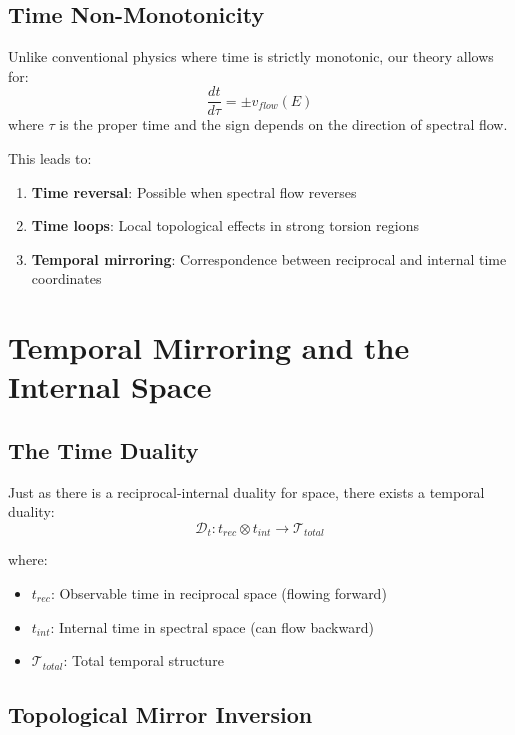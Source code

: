\subsection{Time Non-Monotonicity}

Unlike conventional physics where time is strictly monotonic, our theory allows for:
\begin{equation}
    \frac{dt}{d\tau} = \pm v_{flow}(E)
\end{equation}
where $\tau$ is the proper time and the sign depends on the direction of spectral flow.

This leads to:
\begin{enumerate}
    \item \textbf{Time reversal}: Possible when spectral flow reverses
    \item \textbf{Time loops}: Local topological effects in strong torsion regions
    \item \textbf{Temporal mirroring}: Correspondence between reciprocal and internal time coordinates
\end{enumerate}

\section{Temporal Mirroring and the Internal Space}

\subsection{The Time Duality}

Just as there is a reciprocal-internal duality for space, there exists a temporal duality:
\begin{equation}
    \mathcal{D}_t: t_{rec} \otimes t_{int} \to \mathcal{T}_{total}
\end{equation}

where:
\begin{itemize}
    \item $t_{rec}$: Observable time in reciprocal space (flowing forward)
    \item $t_{int}$: Internal time in spectral space (can flow backward)
    \item $\mathcal{T}_{total}$: Total temporal structure
\end{itemize}

\subsection{Topological Mirror Inversion}

